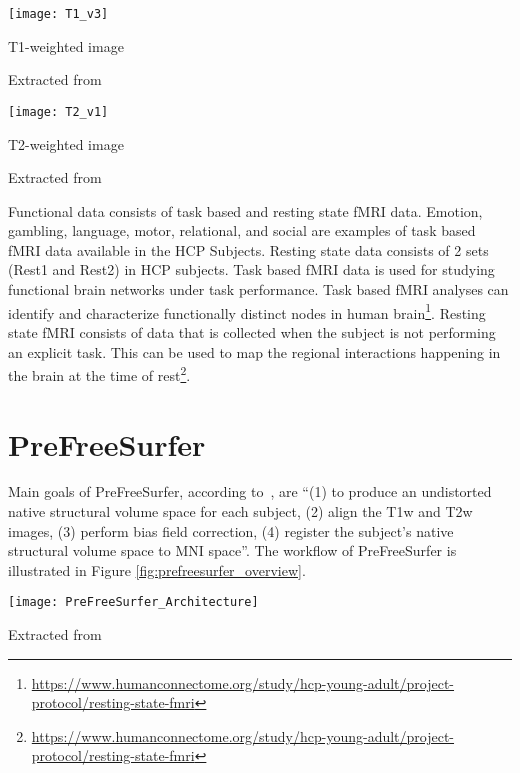 \begin{center}
  \texttt{[image: T1\_v3]}
  \caption{T1-weighted image}
  \label{fig:T1w}
  \caption*{Extracted from \cite{t1w_t2w}}
\end{center}

\begin{center}
  \texttt{[image: T2\_v1]}
  \caption{T2-weighted image}
  \label{fig:T2w}
  \caption*{Extracted from \cite{t1w_t2w}}
\end{center}

\indent Functional data consists of task based and resting state fMRI 
data. Emotion, gambling, language, motor, relational, and social are 
examples of task based fMRI data available in the HCP Subjects. Resting 
state data consists of 2 sets (Rest1 and Rest2) in HCP subjects. Task 
based fMRI data is used for studying functional brain networks under 
task performance. Task based fMRI analyses can identify and 
characterize functionally distinct nodes in human 
brain\footnote{\url{https://www.humanconnectome.org/study/hcp-young-adult/project-protocol/resting-state-fmri}}. 
Resting state fMRI consists of data that is collected when the subject 
is not performing an explicit task. This can be used to map the 
regional interactions happening in the brain at the time of 
rest\footnote{\url{https://www.humanconnectome.org/study/hcp-young-adult/project-protocol/resting-state-fmri}}.

\section{PreFreeSurfer} \label{sec:PrefreeSurfer}
Main goals of PreFreeSurfer, according to~\cite{Gla13}, are ``(1) to produce an undistorted native structural volume space for each subject, (2) align the T1w and T2w images, (3) perform bias field correction, (4) register the subject's native structural volume space to MNI space''. The workflow of PreFreeSurfer is illustrated in Figure \ref{fig:prefreesurfer_overview}.

\begin{center}
  \texttt{[image: PreFreeSurfer\_Architecture]}
  \label{fig:prefreesurfer_overview}
  \caption*{Extracted from \cite{Gla13}}
\end{center}

